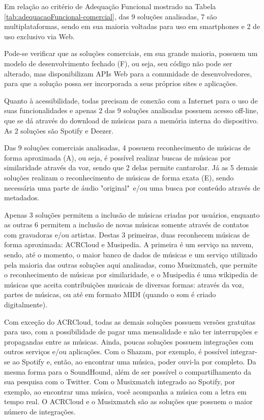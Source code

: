 Em relação ao critério de Adequação Funcional mostrado na Tabela \ref{tab:adequacaoFuncional-comercial}, das 9 soluções analisadas, 7 são multiplataformas, sendo em sua maioria voltadas para uso em smartphones e 2 de uso exclusivo via Web.

Pode-se verificar que as soluções comerciais, em sua grande maioria, possuem um modelo de desenvolvimento fechado (F), ou seja, seu código não pode ser alterado, mas disponibilizam APIs Web para a comunidade de desenvolvedores, para que a solução possa ser incorporada a seus próprios sites e aplicações.

Quanto à acessibilidade, todas precisam de conexão com a Internet para o uso de suas funcionalidades e apenas 2 das 9 soluções analisadas possuem acesso off-line, que se dá através do download de músicas para a memória interna do dispositivo. As 2 soluções são Spotify e Deezer.

Das 9 soluções comerciais analisadas, 4 possuem reconhecimento de músicas de forma aproximada (A), ou seja, é possível realizar buscas de músicas por similaridade através da voz, sendo que 2 delas permite cantarolar. Já as 5 demais soluções realizam o reconhecimento de músicas de forma exata (E), sendo necessária uma parte de áudio "original"\ e/ou uma busca por conteúdo através de metadados.

Apenas 3 soluções permitem a inclusão de músicas criadas por usuários, enquanto as outras 6 permitem a inclusão de novas músicas somente através de contatos com gravadoras e/ou artistas. Destas 3 primeiras, duas reconhecem músicas de forma aproximada: ACRCloud e Musipedia. A primeira é um serviço na nuvem, sendo, até o momento, o maior banco de dados de músicas e um serviço utilizado pela maioria das outras soluções aqui analisadas, como Musixmatch, que permite o reconhecimento de músicas por similaridade, e o Musipedia é uma wikipedia de músicas que aceita contribuições musicais de diversas formas: através da voz, partes de músicas, ou até em formato MIDI (quando o som é criado digitalmente). 

Com exceção do ACRCloud, todas as demais soluções possuem versões gratuitas para uso, com a possibilidade de pagar uma mensalidade e não ter interrupções e propagandas entre as músicas. Ainda, poucas soluções possuem integrações com outros serviços e/ou aplicações. Com o Shazam, por exemplo, é possível integrar-se ao Spotify e, então, ao encontrar uma música, poder ouvi-la por completo. Da mesma forma para o SoundHound, além de ser possível o compartilhamento da sua pesquisa com o Twitter. Com o Musixmatch integrado ao Spotify, por exemplo, ao encontrar uma música, você acompanha a música com a letra em tempo real. O ACRCloud e o Musixmatch são as soluções que possuem o maior número de integrações.

